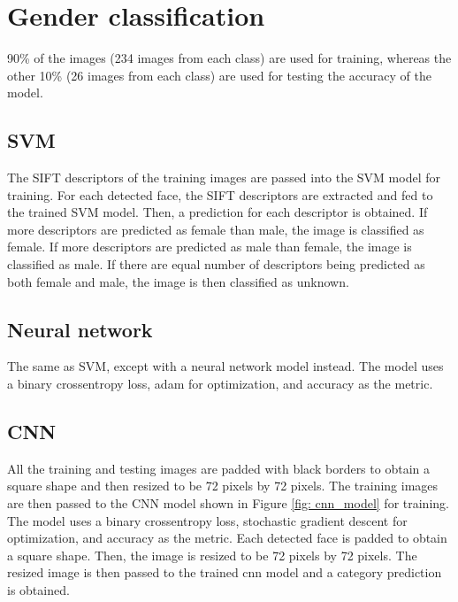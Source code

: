 \documentclass{article}
\begin{document}
\section{Gender classification}
90\% of the images (234 images from each class) are used for training, whereas the other 10\% (26 images from each class) are used for testing the accuracy of the model.

\subsection*{SVM}
The SIFT descriptors of the training images are passed into the SVM model for training.
For each detected face, the SIFT descriptors are extracted and fed to the trained SVM model. Then, a prediction for each descriptor is obtained. If more descriptors are predicted as female than male, the image is classified as female. If more descriptors are predicted as male than female, the image is classified as male. If there are equal number of descriptors being predicted as both female and male, the image is then classified as unknown.

\subsection*{Neural network}
The same as SVM, except with a neural network model instead. The model uses a binary crossentropy loss, adam for optimization, and accuracy as the metric. 

\subsection*{CNN}
All the training and testing images are padded with black borders to obtain a square shape and then resized to be 72 pixels by 72 pixels. The training images are then passed to the CNN model shown in Figure \ref{fig: cnn_model} for training. The model uses a binary crossentropy loss, stochastic gradient descent for optimization, and accuracy as the metric.
Each detected face is padded to obtain a square shape. Then, the image is resized to be 72 pixels by 72 pixels. The resized image is then passed to the trained cnn model and a category prediction is obtained.
\end{document}

